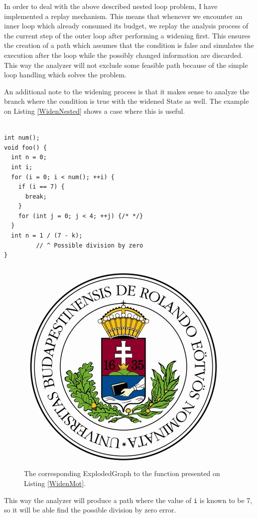 In order to deal with the above described nested loop problem, I have 
implemented a replay mechanism. This means that whenever we encounter an inner 
loop which already consumed its budget, we replay the analysis process of the 
current step of the outer loop after performing a widening first. This ensures
the creation of a path which assumes that the condition is false and simulates 
the execution after the loop while the possibly changed information are 
discarded. This way the analyzer will not exclude some feasible path 
because of the simple loop handling which solves the problem.

An additional note to the widening process is that it makes sense to analyze the branch 
where the condition is true with the widened State as well. The example on 
Listing \ref{WidenNested} shows a case where this is useful.
\\
\\
\begin{lstlisting}
int num();
void foo() {
  int n = 0;
  int i;
  for (i = 0; i < num(); ++i) {
    if (i == 7) {
      break;
    }
    for (int j = 0; j < 4; ++j) {/* */}
  }
  int n = 1 / (7 - k);
         // ^ Possible division by zero
}\end{lstlisting}

\begin{figure}[h]
	\centering
	\includegraphics[scale=0.3]{img/elte-cimer}
	\caption{The corresponding ExplodedGraph to the function presented on 
		Listing \ref{WidenMot}.}
	\label{fig:eg_mot_1}
\end{figure}
This way the analyzer will produce a path where the value of \texttt{i} is 
known
to be 7, so it will be able find the possible division by zero error.
	
